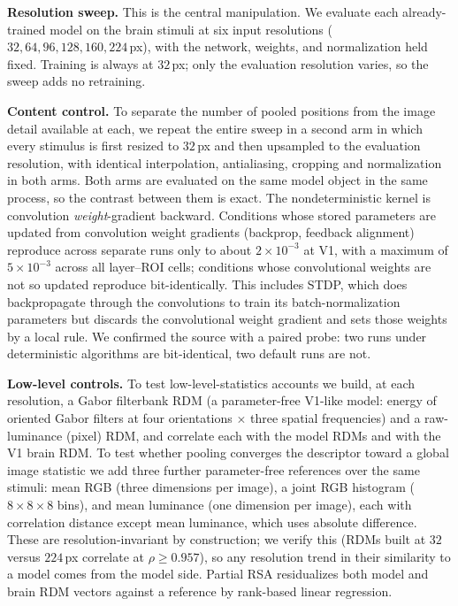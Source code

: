 \documentclass[10pt,twocolumn]{article}
\begin{document}
\textbf{Resolution sweep.} This is the central manipulation. We evaluate each already-trained model on the brain stimuli at six input resolutions ($32, 64, 96, 128, 160, 224$\,px), with the network, weights, and normalization held fixed. Training is always at $32$\,px; only the evaluation resolution varies, so the sweep adds no retraining.

\textbf{Content control.} To separate the number of pooled positions from the image detail available at each, we repeat the entire sweep in a second arm in which every stimulus is first resized to $32$\,px and then upsampled to the evaluation resolution, with identical interpolation, antialiasing, cropping and normalization in both arms. Both arms are evaluated on the same model object in the same process, so the contrast between them is exact. The nondeterministic kernel is convolution \emph{weight}-gradient backward. Conditions whose stored parameters are updated from convolution weight gradients (backprop, feedback alignment) reproduce across separate runs only to about $2\times10^{-3}$ at V1, with a maximum of $5\times10^{-3}$ across all layer--ROI cells; conditions whose convolutional weights are not so updated reproduce bit-identically. This includes STDP, which does backpropagate through the convolutions to train its batch-normalization parameters but discards the convolutional weight gradient and sets those weights by a local rule. We confirmed the source with a paired probe: two runs under deterministic algorithms are bit-identical, two default runs are not.

\textbf{Low-level controls.} To test low-level-statistics accounts we build, at each resolution, a Gabor filterbank RDM (a parameter-free V1-like model: energy of oriented Gabor filters at four orientations $\times$ three spatial frequencies) and a raw-luminance (pixel) RDM, and correlate each with the model RDMs and with the V1 brain RDM. To test whether pooling converges the descriptor toward a global image statistic we add three further parameter-free references over the same stimuli: mean RGB (three dimensions per image), a joint RGB histogram ($8\times8\times8$ bins), and mean luminance (one dimension per image), each with correlation distance except mean luminance, which uses absolute difference. These are resolution-invariant by construction; we verify this (RDMs built at $32$ versus $224$\,px correlate at $\rho \geq 0.957$), so any resolution trend in their similarity to a model comes from the model side. Partial RSA residualizes both model and brain RDM vectors against a reference by rank-based linear regression.
\end{document}
